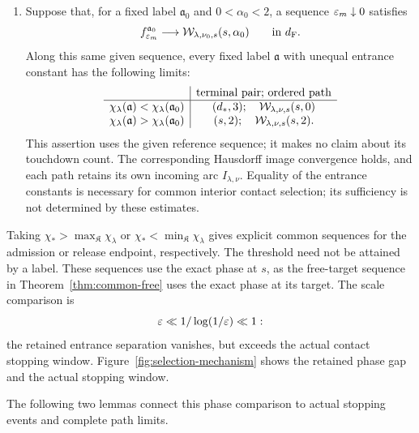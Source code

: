 \begin{proposition}
\begin{enumerate}[label=\textup{(\roman*)},leftmargin=*]
\item Suppose that, for a fixed label $\mathfrak a_0$ and
$0<\alpha_0<2$, a sequence $\varepsilon_m\downarrow0$ satisfies
\[
 f_{\varepsilon_m}^{\mathfrak a_0}
 \longrightarrow\mathcal W_{\lambda,\nu_0,s}(s,\alpha_0)
 \qquad\hbox{in }d_{\mathrm F}.
\]
Along this same given sequence, every fixed label $\mathfrak a$ with
unequal entrance constant has the following limits:
\[
\begin{array}{c|c}
 &\text{terminal pair; ordered path}\\ \hline
 \chi_\lambda(\mathfrak a)<\chi_\lambda(\mathfrak a_0)
   &(d_*,3);\quad\mathcal W_{\lambda,\nu,s}(s,0)\\
 \chi_\lambda(\mathfrak a)>\chi_\lambda(\mathfrak a_0)
   &(s,2);\quad\mathcal W_{\lambda,\nu,s}(s,2).
\end{array}
\]
This assertion uses the given reference sequence; it makes no
claim about its touchdown count. The corresponding Hausdorff image
convergence holds, and each path retains its own incoming arc
$I_{\lambda,\nu}$.
Equality of the entrance constants is necessary for common interior
contact selection; its sufficiency is not determined by these estimates.
\end{enumerate}
\end{proposition}

Taking $\chi_*>\max_{\mathfrak K}\chi_\lambda$ or
$\chi_*<\min_{\mathfrak K}\chi_\lambda$ gives explicit common
sequences for the admission or release endpoint, respectively.
The threshold need not be attained by a label. These sequences use
the exact phase at $s$, as the free-target sequence in
Theorem~\ref{thm:common-free} uses the exact phase at its target.
The scale comparison is
\[
 \varepsilon\ll1/\log(1/\varepsilon)\ll1:
\]
the retained entrance separation vanishes, but exceeds the actual
contact stopping window. Figure~\ref{fig:selection-mechanism} shows
the retained phase gap and the actual stopping window.


The following two lemmas connect this phase comparison to actual
stopping events and complete path limits.

